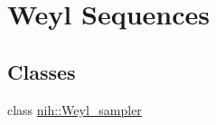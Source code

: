 \hypertarget{group__weyl}{
\section{\-Weyl \-Sequences}
\label{group__weyl}
}
\subsection*{\-Classes}
\begin{DoxyCompactItemize}
\item 
class \hyperlink{classnih_1_1_weyl__sampler}{nih\-::\-Weyl\-\_\-sampler}
\end{DoxyCompactItemize}
